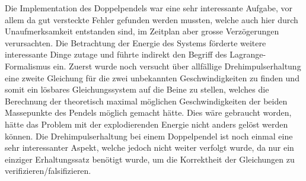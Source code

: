 \documentclass[titlepage, 11pt, a4paper, ngerman]{article}
\begin{document}
Die Implementation des Doppelpendels war eine sehr interessante Aufgabe, vor allem da gut versteckte Fehler gefunden werden mussten, welche auch hier durch Unaufmerksamkeit entstanden sind, im Zeitplan aber grosse Verzögerungen verursachten. Die Betrachtung der Energie des Systems förderte weitere interessante Dinge zutage und führte indirekt den Begriff des Lagrange-Formalismus ein. Zuerst wurde noch versucht über allfällige Drehimpulserhaltung eine zweite Gleichung für die zwei unbekannten Geschwindigkeiten zu finden und somit ein lösbares Gleichungssystem auf die Beine zu stellen, welches die Berechnung der theoretisch maximal möglichen Geschwindigkeiten der beiden Massepunkte des Pendels möglich gemacht hätte. Dies wäre gebraucht worden, hätte das Problem mit der explodierenden Energie nicht anders gelöst werden können. Die Drehimpulserhaltung bei einem Doppelpendel ist noch einmal eine sehr interessanter Aspekt, welche jedoch nicht weiter verfolgt wurde, da nur ein einziger Erhaltungssatz benötigt wurde, um die Korrektheit der Gleichungen zu verifizieren/falsifizieren.


\newpage
\end{document}
